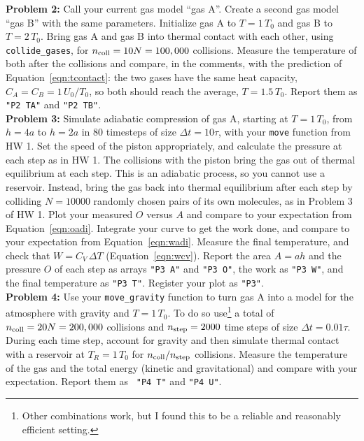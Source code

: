 \documentclass[12pt]{article}
\begin{document}
\noindent
{\bf Problem 2:} Call your current gas model ``gas A''.  Create a
second gas model ``gas B'' with the same parameters.  Initialize gas A
to $T=1\, T_0$ and gas B to $T=2\, T_0$.  Bring gas A and gas B into
thermal contact with each other, using {\tt collide\_gases}, for
$n_{\rm coll} = 10 N = 100,000$ collisions.  Measure the temperature
of both after the collisions and compare, in the comments, with the
prediction of Equation~\ref{eqn:tcontact}: the two gases have the same
heat capacity, $C_A = C_B = 1\,U_0/T_0$, so both should reach the
average, $T = 1.5\,T_0$.  Report them as {\tt "P2
  TA"} and {\tt "P2 TB"}.\\[3pt]

\noindent
{\bf Problem 3:} Simulate adiabatic compression of gas A, starting at
$T = 1\,T_0$, from $h=4a$ to $h=2a$ in 80 timesteps of size $\Delta t
= 10 \tau$, with your {\tt move} function from HW 1.  Set the speed of
the piston appropriately, and calculate the pressure at each step as
in HW 1.  The collisions with the piston bring the gas out of thermal
equilibrium at each step.  This is an adiabatic process, so you cannot
use a reservoir.  Instead, bring the gas back into thermal equilibrium
after each step by colliding $N = 10000$ randomly chosen pairs of its
own molecules, as in Problem 3 of HW 1.  Plot your measured $O$ versus
$A$ and compare to your expectation from Equation~\ref{eqn:oadi}.
Integrate your curve to get the work done, and compare to your
expectation from Equation~\ref{eqn:wadi}.  Measure the final
temperature, and check that $W = C_V\,\Delta T$
(Equation~\ref{eqn:wcv}).  Report the area $A = a h$ and the pressure
$O$ of each step as arrays {\tt "P3 A"} and {\tt "P3 O"}, the work as
{\tt "P3 W"}, and the final temperature as {\tt "P3 T"}.  Register
your plot as {\tt "P3"}.\\[3pt]

\noindent
{\bf Problem 4:} Use your {\tt move\_gravity} function to turn gas A
into a model for the atmosphere with gravity and $T = 1\,T_0$.  To do
so use\footnote{Other combinations work, but I found this to be a
  reliable and reasonably efficient setting.} a total of $n_{\rm coll}
= 20 N = 200,000$ collisions and $n_{\rm step} = 2000$ time steps of
size $\Delta t = 0.01\tau$.  During each time step, account for
gravity and then simulate thermal contact with a reservoir at $T_R = 1\,
T_0$ for $n_{\rm coll}/n_{\rm step}$ collisions.  Measure the
temperature of the gas and the total energy (kinetic and
gravitational) and compare with your expectation.  Report them as {\tt
  "P4 T"} and {\tt "P4 U"}.\\[3pt]
\end{document}
